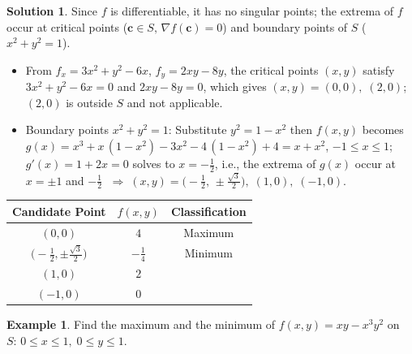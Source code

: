 \documentclass[10pt]{extarticle}
\newcommand{\ds}{\displaystyle}
\newcommand{\ie}{\;\Longrightarrow\;}
\theoremstyle{definition}
\newtheorem*{ex}{Example}
\newtheorem*{sol}{Solution}
\newcommand{\vc}{\mathbf{c}}
\begin{document}
\begin{sol}
  Since $f$ is differentiable, it has no singular points; the extrema of $f$ occur at critical points ($\vc\in S,\,\nabla f(\vc) = 0$) and boundary points of $S$ ($x^2 + y^2 = 1$). 
  \begin{itemize}%
    \item From $\ds f_x = 3x^2 + y^2 - 6x$, $\ds f_y = 2xy - 8y$, the critical points $(x, y)$ satisfy $\ds 3x^2 + y^2 - 6x = 0$ and $2xy - 8y = 0$, which gives $(x, y) = (0, 0),\;(2, 0)$; $(2, 0)$ is outside $S$ and not applicable. 
    \item Boundary points $x^2 + y^2 = 1$: Substitute $y^2 = 1 - x^2$ then $f(x, y)$ becomes $g(x) = x^3 + x\,(1 - x^2) - 3x^2 - 4\,(1 - x^2) + 4 = x + x^2$, $-1\leqslant x\leqslant 1$; $g'(x) = 1 + 2x = 0$ solves to $x = -\frac{1}{2}$, i.e., the extrema of $g(x)$ occur at $x = \pm 1$ and $-\frac{1}{2}$ $\ie (x, y) = \big(-\frac{1}{2},\,\pm\frac{\sqrt{3}}{2}\big),\;(1, 0),\;(-1, 0)$.  
  \end{itemize}
  \begin{center}
  \begin{tabular}{ccc}
    \toprule
    Candidate Point & $f(x, y)$ & Classification \\    
    \midrule
    $(0, 0)$  & $4$ & Maximum \\ 
    $\big(-\frac{1}{2}, \pm\frac{\sqrt{3}}{2}\big)$  & $-\frac{1}{4}$ & Minimum \\ 
    $(1, 0)$  & $2$ &  \\ 
    $(-1, 0)$ & $0$ &  \\ \bottomrule
  \end{tabular}
  \end{center}
\end{sol}

\newpage

\begin{ex}
  Find the maximum and the minimum of $\ds f(x, y) = xy - x^3y^2$ on $S:\, 0\leqslant x\leqslant 1,\;0\leqslant y\leqslant 1$. 
\end{ex}
\end{document}
